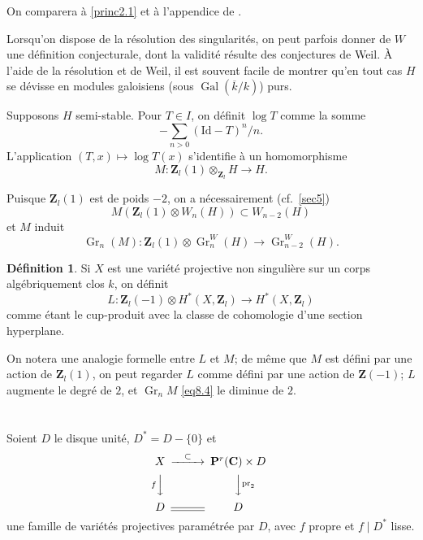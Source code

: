 \documentclass[12pt]{amsart}
\theoremstyle{definition}
\newtheorem{definition}{Définition}[section]
\DeclareMathOperator{\Gr}{Gr}
\DeclareMathOperator{\Gal}{Gal}
\DeclareMathOperator{\pr}{pr}
\newcommand{\Z}{\mathbf{Z}}
\newcommand{\C}{\mathbf{C}}
\begin{document}
On comparera à \ref{princ2.1} et à l'appendice de \cite{Tate}.

Lorsqu'on dispose de la résolution des singularités, on peut parfois donner de $W$ une définition conjecturale, dont la validité résulte des conjectures de Weil. À l'aide de la résolution et de Weil, il est souvent facile de montrer qu'en tout cas $H$ se dévisse en modules galoisiens (sous $\Gal(\overline{k}/k)$) purs.

Supposons $H$ semi-stable. Pour $T \in I$, on définit $\log T$ comme la somme
\[
-\sum_{n>0} (\mathrm{Id} - T)^{n}/n.
\]
L'application $(T, x) \mapsto \log T(x)$ s'identifie à un homomorphisme
\begin{equation}\label{eq8.2}
M : \Z_{l}(1) \otimes_{\Z_{l}} H \to H.
\end{equation}

Puisque $\Z_{l}(1)$ est de poids $-2$, on a nécessairement (cf.\ \ref{sec5})
\begin{equation}\label{eq8.3}
M(\Z_{l}(1) \otimes W_{n}(H)) \subset W_{n-2}(H)
\end{equation}
et $M$ induit
\begin{equation}\label{eq8.4}
\Gr_{n}(M) : \Z_{l}(1) \otimes \Gr_{n}^{W}(H) \to \Gr_{n-2}^{W}(H).
\end{equation}

\begin{definition}\label{def8.5}
Si $X$ est une variété projective non singulière sur un corps algébriquement clos $k$, on définit
\[
L : \Z_{l}(-1) \otimes H^{*}(X, \Z_{l}) \to H^{*}(X, \Z_{l})
\]
comme étant le cup-produit avec la classe de cohomologie d'une section hyperplane.
\end{definition}

On notera une analogie formelle entre $L$ et $M$; de même que $M$ est défini par une action de $\Z_{l}(1)$, on peut regarder $L$ comme défini par une action de $\Z(-1)$; $L$ augmente le degré de $2$, et $\Gr_{n} M$ \eqref{eq8.4} le diminue de $2$.

\section{}\label{sec9}

Soient $D$ le disque unité, $D^{*} = D - \{0\}$ et
\[
\begin{CD}
X @>{\subset}>> \mathbf{P}^{r}(\C) \times D \\
@V{f}VV @VV{\pr_{2}}V \\
D @= D
\end{CD}
\]
une famille de variétés projectives paramétrée par $D$, avec $f$ propre et $f \mid D^{*}$ lisse.
\end{document}
